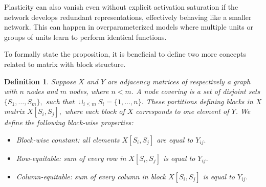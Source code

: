 \documentclass{article}
\newtheorem{definition}{Definition}[section]
\begin{document}
Plasticity can also vanish even without explicit activation saturation if the network develops redundant representations, effectively behaving like a smaller network. This can happen in overparameterized models where multiple units or groups of units learn to perform identical functions.

To formally state the proposition, it is beneficial to define two more concepts related to matrix with block structure. 
\begin{definition}
    Suppose $X$ and $Y$ are adjacency matrices of respectively a graph with $n$ nodes and $m$ nodes, where $n < m$. A node covering is a set of disjoint sets  $\{S_1,\dots,S_m\},$ such that $\cup_{i\le m} S_i = \{1,\dots,n\}. $ These partitions defining blocks in $X$ matrix $X[S_i,S_j],$ where each block of $X$ corresponds to one element of $Y$.  We define the following block-wise properties: 
    \begin{itemize}
        \item Block-wise constant: all elements $X[S_i,S_j]$ are equal to $Y_{ij}.$
        \item Row-equitable: sum of every row in $X[S_i,S_j]$ is equal to $Y_{ij}.$
        \item Column-equitable: sum of every column in block $X[S_i,S_j]$ is equal to $Y_{ij}.$
    \end{itemize}
\end{definition}
\end{document}
